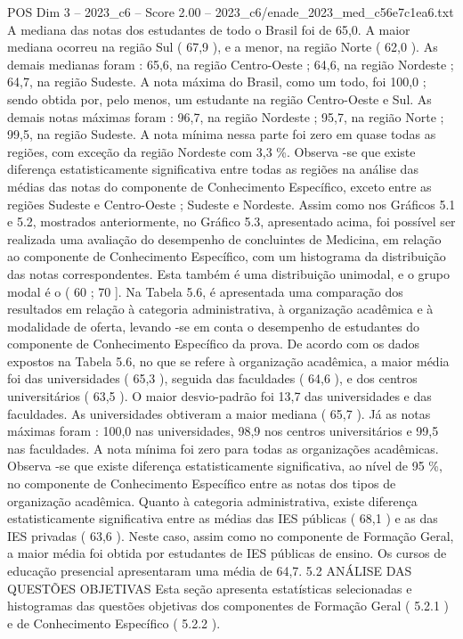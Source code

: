 \begin{textsample}{POS Dim 3 – 2023\_c6 – Score 2.00 – 2023\_c6/enade\_2023\_med\_c56e7c1ea6.txt}
A mediana das notas dos estudantes de todo o Brasil foi de 65,0.
A maior mediana ocorreu na região Sul ( 67,9 ), e a menor, na região Norte ( 62,0 ).
As demais medianas foram : 65,6, na região Centro-Oeste ; 64,6, na região Nordeste ; 64,7, na região Sudeste.
A nota máxima do Brasil, como um todo, foi 100,0 ; sendo obtida por, pelo menos, um estudante na região Centro-Oeste e Sul.
As demais notas máximas foram : 96,7, na região Nordeste ; 95,7, na região Norte ; 99,5, na região Sudeste.
A nota mínima nessa parte foi zero em quase todas as regiões, com exceção da região Nordeste com 3,3 \%.
Observa -se que existe diferença estatisticamente significativa entre todas as regiões na análise das médias das notas do componente de Conhecimento Específico, exceto entre as regiões Sudeste e Centro-Oeste ; Sudeste e Nordeste.
Assim como nos Gráficos 5.1 e 5.2, mostrados anteriormente, no Gráfico 5.3, apresentado acima, foi possível ser realizada uma avaliação do desempenho de concluintes de Medicina, em relação ao componente de Conhecimento Específico, com um histograma da distribuição das notas correspondentes.
Esta também é uma distribuição unimodal, e o grupo modal é o ( 60 ; 70 ].
Na Tabela 5.6, é apresentada uma comparação dos resultados em relação à categoria administrativa, à organização acadêmica e à modalidade de oferta, levando -se em conta o desempenho de estudantes do componente de Conhecimento Específico da prova.
De acordo com os dados expostos na Tabela 5.6, no que se refere à organização acadêmica, a maior média foi das universidades ( 65,3 ), seguida das faculdades ( 64,6 ), e dos centros universitários ( 63,5 ).
O maior desvio-padrão foi 13,7 das universidades e das faculdades.
As universidades obtiveram a maior mediana ( 65,7 ).
Já as notas máximas foram : 100,0 nas universidades, 98,9 nos centros universitários e 99,5 nas faculdades.
A nota mínima foi zero para todas as organizações acadêmicas.
Observa -se que existe diferença estatisticamente significativa, ao nível de 95 \%, no componente de Conhecimento Específico entre as notas dos tipos de organização acadêmica.
Quanto à categoria administrativa, existe diferença estatisticamente significativa entre as médias das IES públicas ( 68,1 ) e as das IES privadas ( 63,6 ).
Neste caso, assim como no componente de Formação Geral, a maior média foi obtida por estudantes de IES públicas de ensino.
Os cursos de educação presencial apresentaram uma média de 64,7. 5.2 ANÁLISE DAS QUESTÕES OBJETIVAS Esta seção apresenta estatísticas selecionadas e histogramas das questões objetivas dos componentes de Formação Geral ( 5.2.1 ) e de Conhecimento Específico ( 5.2.2 ).

\end{textsample}
